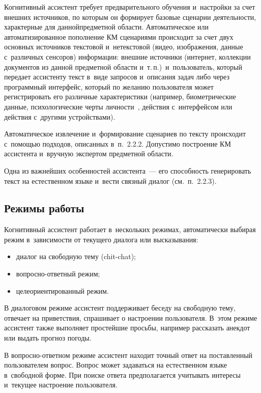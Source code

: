 \begin{multicols}{2}
  Когнитивный ассистент требует предварительного обучения и~настройки за 
счет внешних ис\-точников, по которым он формирует базовые сценарии 
деятельности, характерные для данной\linebreak предметной области. Автоматическое 
или автоматизированное пополнение КМ сценариями происходит за счет двух 
основных источников текстовой и~нетекстовой (видео, изображения, данные 
с~различных сенсоров) информации: внешние источники (интернет, коллекции 
документов из данной предметной об\-ласти и~т.\,п.)\ и~пользователь, который 
передает ас\-сис\-тен\-ту текст в~виде запросов и~описания задач либо через 
программный интерфейс, который по желанию пользователя может 
регистрировать его различные характеристики (например, био\-мет\-ри\-че\-ские 
данные, психологические черты лич\-ности~\cite{4-sm}, действия с~интерфейсом 
или действия с~другими устройствами). 

Автоматическое извлечение 
и~формирование сценариев по тексту происходит с~помощью подходов, 
описанных в~п.~2.2.2. До\-пус\-ти\-мо по\-стро\-ение КМ ассистента 
и~вручную экспертом предметной об\-ласти.
  
  Одна из важнейших особенностей ассистента~--- его способность 
генерировать текст на естественном языке и~вести связный диалог (см.\ 
п.~2.2.3).

  
  \subsection{Режимы работы} %
  
  Когнитивный ассистент работает в~нескольких режимах, автоматически 
выбирая режим в~зависимости от текущего диалога или высказывания:
  \begin{itemize}
\item диалог на свободную тему (chit-chat);
\item вопросно-ответный режим;
\item целеориентированный режим.
\end{itemize}

  В диалоговом режиме ассистент поддерживает беседу на свободную тему, 
отвечает на приветствия, спрашивает о настроении пользователя. В~этом 
режиме ассистент также выполняет простейшие просьбы, например рассказать 
анекдот или выдать прогноз погоды.
  
  В вопросно-ответном режиме ассистент находит точный ответ на 
поставленный пользователем вопрос. Вопрос может задаваться на естественном 
языке в~свободной форме. При поиске ответа предполагается учитывать 
интересы и~текущее настроение пользователя.
  

\end{multicols}
